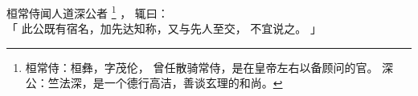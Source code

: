 
\switchcolumn*[\section{}]

桓常侍闻人道深公者%
\footnote{%
    桓常侍：桓彝，字茂伦，
            曾任散骑常侍，是在皇帝左右以备顾问的官。
    深公：竺法深，是一个德行高洁，善谈玄理的和尚。
}%
，
辄曰：\\「
    此公既有宿名，加先达知称，又与先人至交，
    不宜说之。
」

\switchcolumn


